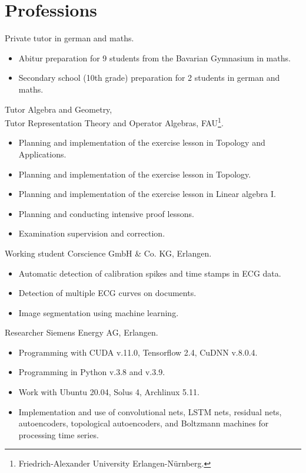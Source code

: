 \documentclass[a4paper,12pt]{article}
\newcommand{\years}[1]{\marginnote{\scriptsize #1}}
\begin{document}
\section*{Professions}
\years{2024--25} Private tutor in german and maths.
\begin{itemize}
    \item Abitur preparation for 9 students from the Bavarian Gymnasium in maths.
    \item Secondary school (10th grade) preparation for 2 students in german and maths. 
\end{itemize}
\years{2023--24} Tutor Algebra and Geometry, \\
	      Tutor Representation Theory and Operator Algebras, FAU\footnote{Friedrich-Alexander University Erlangen-Nürnberg.}.
\begin{itemize}
    \item Planning and implementation of the exercise lesson in \glqq Topology and Applications\grqq.
    \item Planning and implementation of the exercise lesson in \glqq Topology\grqq.
    \item Planning and implementation of the exercise lesson in \glqq Linear algebra I\grqq.
    \item Planning and conducting intensive proof lessons.
    \item Examination supervision and correction.
\end{itemize}
\years{2021--22} Working student Corscience GmbH \& Co. KG, Erlangen.
\begin{itemize}
    \item Automatic detection of calibration spikes and time stamps in ECG data.
    \item Detection of multiple ECG curves on documents.
    \item Image segmentation using machine learning.
\end{itemize}
\years{2019--21} Researcher Siemens Energy AG, Erlangen.
\begin{itemize}
    \item Programming with CUDA v.11.0, Tensorflow 2.4, CuDNN v.8.0.4.
    \item Programming in Python v.3.8 and v.3.9.
    \item Work with Ubuntu 20.04, Solus 4, Archlinux 5.11.
    \item Implementation and use of convolutional nets, LSTM nets, residual nets, autoencoders, topological autoencoders, and Boltzmann machines for processing time series.
\end{itemize}
\end{document}
